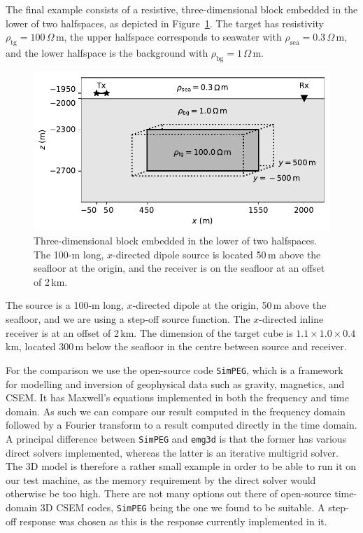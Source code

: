 \documentclass[extra, camera,%
    onecolumn,   %
    referee,     %
]{gji}
\newlength{\cwidth}
\newcommand{\mr}[1]{\mathrm{#1}}
\newcommand{\emg}[2]{\texttt{emg#1#2}\xspace}
\newcommand{\simpeg}{\texttt{SimPEG}\xspace}
\newcommand{\ohmm}{\ensuremath{\Omega\,}\text{m}\xspace}
\begin{document}
The final example consists of a resistive, three-dimensional block embedded in
the lower of two halfspaces, as depicted in Figure~\ref{fig:3d-model}. The
target has resistivity $\rho_\mr{tg}=100\,\ohmm$, the upper halfspace
corresponds to seawater with $\rho_\mr{sea}=0.3\,\ohmm$, and the lower
halfspace is the background with $\rho_\mr{bg}=1\,\ohmm$.
%
\begin{figure}
  \centering
  \includegraphics[width=\cwidth]{09-3d-model}
  \caption{Three-dimensional block embedded in the lower of two halfspaces. The
    100-m long, $x$-directed dipole source is located 50\,m above the seafloor
    at the origin, and the receiver is on the seafloor at an offset of 2\,km.}
  \label{fig:3d-model}
\end{figure}
%
The source is a 100-m long, $x$-directed dipole at the origin, 50\,m above the
seafloor, and we are using a step-off source function. The $x$-directed inline
receiver is at an offset of 2\,km. The dimension of the target cube is
$1.1\times1.0\times0.4$\,km, located 300\,m below the seafloor in the centre
between source and receiver.

For the comparison we use the open-source code \simpeg \citep{CAG.15.Cockett},
which is a framework for modelling and inversion of geophysical data such as
gravity, magnetics, and CSEM. It has Maxwell's equations implemented in both
the frequency and time domain. As such we can compare our result computed in
the frequency domain followed by a Fourier transform to a result computed
directly in the time domain. A principal difference between \simpeg and \emg3d
is that the former has various direct solvers implemented, whereas the latter
is an iterative multigrid solver. The 3D model is therefore a rather small
example in order to be able to run it on our test machine, as the memory
requirement by the direct solver would otherwise be too high. There are not
many options out there of open-source time-domain 3D CSEM codes, \simpeg being
the one we found to be suitable. A step-off response was chosen as this is the
response currently implemented in it.
\end{document}
